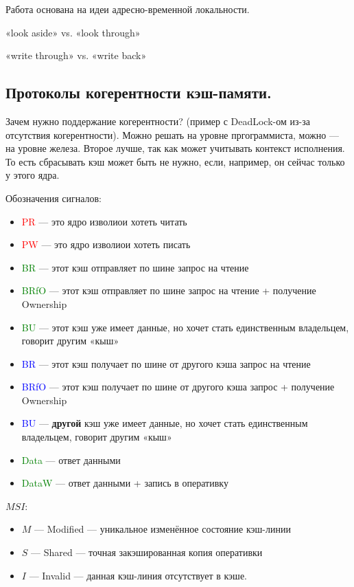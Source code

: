 \documentclass[12pt, a4paper]{article}
\begin{document}
Работа основана на идеи адресно-временной локальности.

«look aside» vs. «look through»

«write through» vs. «write back»


\subsection{Протоколы когерентности кэш-памяти.}

Зачем нужно поддержание когерентности? (пример с DeadLock-ом из-за отсутствия когерентности).
Можно решать на уровне пргограммиста, можно — на уровне железа. 
Второе лучше, так как может учитывать контекст исполнения. 
То есть сбрасывать кэш может быть не нужно, если, например, он сейчас только у этого ядра.


Обозначения сигналов:

\begin{itemize}
    \item \textcolor{red}{PR} — это ядро изволиои хотеть читать
    \item \textcolor{red}{PW} — это ядро изволиои хотеть писать
    \item \textcolor{green}{BR} — этот кэш отправляет по шине запрос на чтение
    \item \textcolor{green}{BRfO} — этот кэш отправляет по шине запрос на чтение + получение Ownership
    \item \textcolor{green}{BU} — этот кэш уже имеет данные, но хочет стать единственным владельцем, говорит другим «кыш»
    \item \textcolor{blue}{BR} — этот кэш получает по шине от другого кэша запрос на чтение
    \item \textcolor{blue}{BRfO} — этот кэш получает по шине от другого кэша запрос + получение Ownership
    \item \textcolor{blue}{BU} — \textbf{другой} кэш уже имеет данные, но хочет стать единственным владельцем, говорит другим «кыш»
    \item \textcolor{green}{Data} — ответ данными
    \item \textcolor{green}{DataW} — ответ данными + запись в оперативку
\end{itemize}

$MSI$:

\begin{itemize}
    \item $M$ — Modified — уникальное изменённое состояние кэш-линии
    \item $S$ — Shared — точная закэшированная копия оперативки
    \item $I$ — Invalid — данная кэш-линия отсутствует в кэше.
\end{itemize}
\end{document}
